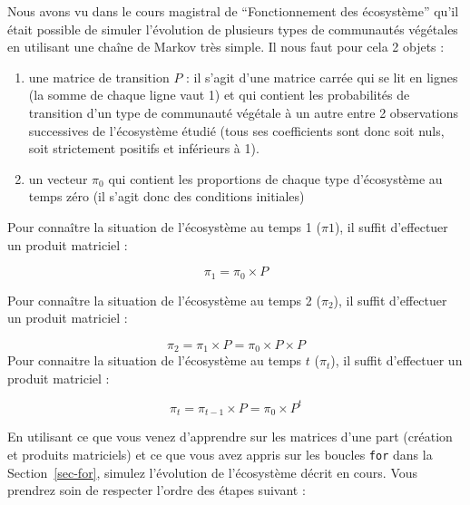 \documentclass[
  french,
  a4paper,
  DIV=11,
  numbers=noendperiod,
  oneside]{scrreprt}
\providecommand{\tightlist}{%
  \setlength{\itemsep}{0pt}\setlength{\parskip}{0pt}}
\begin{document}
\begin{tcolorbox}
Nous avons vu dans le cours magistral de ``Fonctionnement des
écosystème'' qu'il était possible de simuler l'évolution de plusieurs
types de communautés végétales en utilisant une chaîne de Markov très
simple. Il nous faut pour cela 2 objets :

\begin{enumerate}
\def\labelenumi{\arabic{enumi}.}
\tightlist
\item
  une matrice de transition \(P\) : il s'agit d'une matrice carrée qui
  se lit en lignes (la somme de chaque ligne vaut 1) et qui contient les
  probabilités de transition d'un type de communauté végétale à un autre
  entre 2 observations successives de l'écosystème étudié (tous ses
  coefficients sont donc soit nuls, soit strictement positifs et
  inférieurs à 1).
\item
  un vecteur \(\pi_0\) qui contient les proportions de chaque type
  d'écosystème au temps zéro (il s'agit donc des conditions initiales)
\end{enumerate}

Pour connaître la situation de l'écosystème au temps 1 (\(\pi1\)), il
suffit d'effectuer un produit matriciel :

\[ \pi_1 = \pi_0 \times P\]

Pour connaître la situation de l'écosystème au temps 2 (\(\pi_2\)), il
suffit d'effectuer un produit matriciel :

\[ \pi_2 = \pi_1 \times P = \pi_0 \times P \times P\] Pour connaitre la
situation de l'écosystème au temps \(t\) (\(\pi_t\)), il suffit
d'effectuer un produit matriciel :

\[ \pi_t = \pi_{t-1} \times P = \pi_0 \times P^t\]

En utilisant ce que vous venez d'apprendre sur les matrices d'une part
(création et produits matriciels) et ce que vous avez appris sur les
boucles \texttt{for} dans la Section~\ref{sec-for}, simulez l'évolution
de l'écosystème décrit en cours. Vous prendrez soin de respecter l'ordre
des étapes suivant :


\end{tcolorbox}
\end{document}
